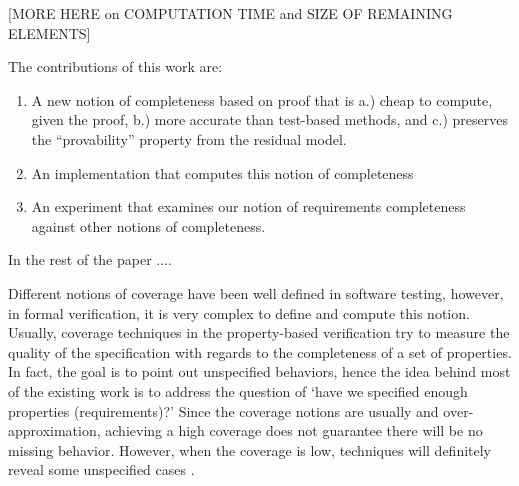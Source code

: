 [MORE HERE on COMPUTATION TIME and SIZE OF REMAINING ELEMENTS]

The contributions of this work are: 
\begin{enumerate}
\item A new notion of completeness based on proof that is a.) cheap to compute, given the proof, b.) more accurate than test-based methods, and c.) preserves the ``provability'' property from the residual model.
\item An implementation that computes this notion of completeness
\item An experiment that examines our notion of requirements completeness against other notions of completeness.
\end{enumerate}

In the rest of the paper ....




Different notions of coverage have been well defined in software testing, however, in formal verification, it is very complex to define and compute this notion.
Usually, coverage techniques in the property-based verification try to measure the quality of the specification with regards to the completeness of a set of properties.
In fact, the goal is to point out unspecified behaviors, hence the idea behind most of the existing work is to address the question of `have we specified enough properties (requirements)?'
Since the coverage notions are usually  and over-approximation, achieving a high coverage does not guarantee there will be no missing behavior. However, when the coverage is low, techniques will definitely reveal some unspecified cases \cite{claessen2007coverage}.
